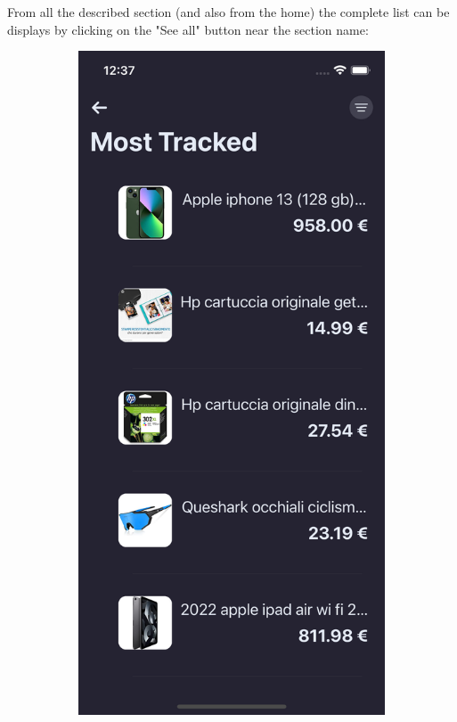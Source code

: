 From all the described section (and also from the home) the complete list can be displays by clicking on the "See all" button near the section name:

\begin{figure}[h!]
        \centering
        \begin{subfigure}[b]{0.3\textwidth}
            \centering
            \includegraphics[width=\textwidth]{images/interfaces/see_all_explore_screen.png}

\end{subfigure}
\end{figure}
